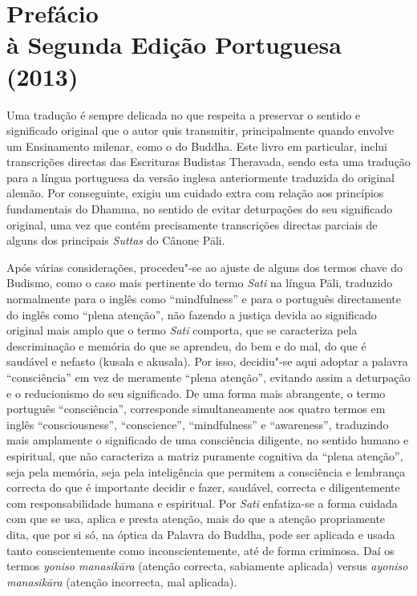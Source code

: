 \chapter[Prefácio à Segunda Edição Portuguesa (2013)]{Prefácio\\ à Segunda Edição Portuguesa\\ (2013)}

Uma tradução é sempre delicada no que respeita a preservar o sentido e
significado original que o autor quis transmitir, principalmente quando envolve
um Ensinamento milenar, como o do Buddha. Este livro em particular, inclui
transcrições directas das Escrituras Budistas Theravada, sendo esta uma tradução
para a língua portuguesa da versão inglesa anteriormente traduzida do original
alemão. Por conseguinte, exigiu um cuidado extra com relação aos princípios
fundamentais do Dhamma, no sentido de evitar deturpações do seu significado
original, uma vez que contém precisamente transcrições directas parciais de
alguns dos principais \emph{Suttas} do Cânone Pāli.

Após várias considerações, procedeu"-se ao ajuste de alguns dos termos chave do
Budismo, como o caso mais pertinente do termo \emph{Sati} na língua Pāli,
traduzido normalmente para o inglês como “mindfulness” e para o português
directamente do inglês como “plena atenção”, não fazendo a justiça devida ao
significado original mais amplo que o termo \emph{Sati} comporta, que se caracteriza
pela descriminação e memória do que se aprendeu, do bem e do mal, do que é saudável e
nefasto (kusala e akusala). Por isso, decidiu"-se aqui adoptar a palavra “consciência”
em vez de meramente “plena atenção”, evitando assim a deturpação e o reducionismo do
seu significado. De uma forma mais abrangente, o termo português “consciência”, 
corresponde simultaneamente aos quatro termos em inglês “consciousness”, “conscience”,
“mindfulness” e “awareness”, traduzindo mais amplamente o significado de uma consciência 
diligente, no sentido humano e espiritual, que não caracteriza a matriz puramente cognitiva da 
“plena atenção”, seja pela memória, seja pela inteligência que permitem a consciência e 
lembrança correcta do que é importante decidir e fazer, saudável, correcta e diligentemente
com responsabilidade humana e espiritual. Por \emph{Sati} enfatiza-se a forma cuidada com que se
usa, aplica e presta atenção, mais do que a atenção propriamente dita, que por
si só, na óptica da Palavra do Buddha, pode ser aplicada e usada tanto 
conscientemente como inconscientemente, até de forma criminosa. 
Daí os termos \emph{yoniso manasikāra} (atenção correcta, sabiamente aplicada) 
versus \emph{ayoniso manasikāra} (atenção incorrecta, mal aplicada).

